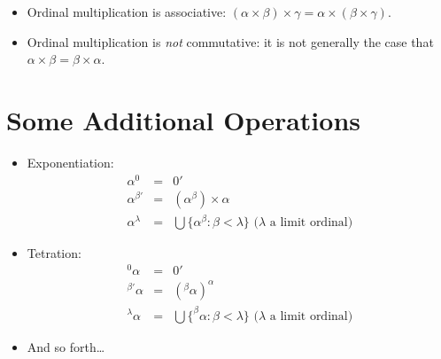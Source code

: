 \documentclass[12pt]{extarticle}
\begin{document}
\begin{itemize}
\item Ordinal multiplication is associative: \((\alpha\times\beta)\times\gamma = \alpha\times(\beta\times\gamma)\).

\item Ordinal multiplication is \emph{not} commutative: it is not generally the case that $\alpha \times \beta = \beta \times \alpha$.
\end{itemize}


\section{Some Additional Operations}


\begin{itemize}

\item Exponentiation:
\[
\begin{array}{lcl}
 \alpha^0 &= & 0'  \\
 \alpha^{\beta'} &= &(\alpha^\beta) \times \alpha \\
 \alpha^{\lambda} &= & \bigcup \{\alpha^\beta : \beta < \lambda\} \text{ ($\lambda$ a limit ordinal)}
 \end{array}
\]

\item Tetration:
\[
\begin{array}{lcl}
 ^0\alpha &= & 0'  \\
 ^{\beta'}\alpha &= &(^\beta\alpha)^\alpha \\
 ^{\lambda}\alpha &= & \bigcup \{^\beta\alpha : \beta < \lambda\} \text{ ($\lambda$ a limit ordinal)}
 \end{array}
\]

\item And so forth\dots

\end{itemize}
\end{document}
